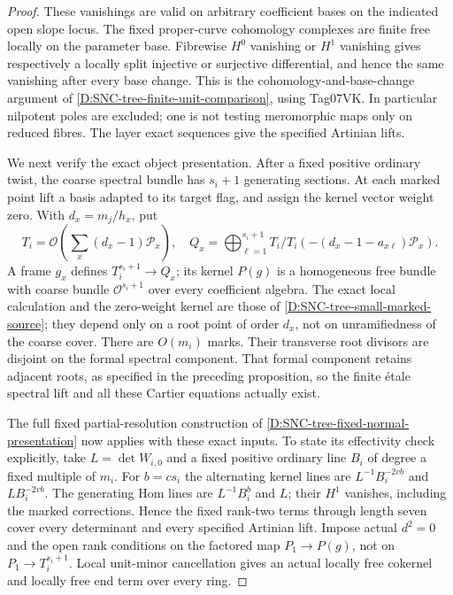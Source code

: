 \begin{proof}
These vanishings are valid on arbitrary coefficient
bases on the indicated open slope locus. The fixed
proper-curve cohomology complexes are finite free
locally on the parameter base. Fibrewise \(H^0\)
vanishing or \(H^1\) vanishing gives respectively
a locally split injective or surjective differential,
and hence the same vanishing after every base change.
This is the cohomology-and-base-change argument of
\ref{D:SNC-tree-finite-unit-comparison}, using
Tag07VK. In particular nilpotent poles are excluded;
one is not testing meromorphic maps only on reduced
fibres. The layer exact sequences give the specified
Artinian lifts.

We next verify the exact object presentation. After
a fixed positive ordinary twist, the coarse spectral
bundle has \(s_i+1\) generating sections. At each
marked point lift a basis adapted to its target
flag, and assign the kernel vector weight zero.
With \(d_x=m_j/h_x\), put
\[
 T_i=\mathcal O\!\left(\sum_x(d_x-1)\mathcal P_x\right),
 \quad
 Q_x=\bigoplus_{\ell=1}^{s_i+1}
     T_i/T_i(-(d_x-1-a_{x\ell})\mathcal P_x).
                                                        \tag{D.GP.7}
\]
A frame \(g_x\) defines \(T_i^{s_i+1}\to Q_x\);
its kernel \(P(g)\) is a homogeneous free bundle
with coarse bundle \(\mathcal O^{s_i+1}\) over
every coefficient algebra. The exact local
calculation and the zero-weight kernel are those
of \ref{D:SNC-tree-small-marked-source}; they depend
only on a root point of order \(d_x\), not on
unramifiedness of the coarse cover.
There are \(O(m_i)\) marks. Their transverse root
divisors are disjoint on the formal spectral
component. That formal component retains adjacent
roots, as specified in the preceding proposition,
so the finite étale spectral lift and all these
Cartier equations actually exist.

The full fixed partial-resolution construction of
\ref{D:SNC-tree-fixed-normal-presentation} now applies
with these exact inputs. To state its effectivity
check explicitly, take \(L=\det W_{i,0}\) and a
fixed positive ordinary line \(B_i\) of degree
a fixed multiple of \(m_i\). For \(b=cs_i\) the
alternating kernel lines are
\(L^{-1}B_i^{-2vb}\) and \(LB_i^{-2vb}\).
The generating Hom lines are \(L^{-1}B_i^b\) and
\(L\); their \(H^1\) vanishes, including the marked
corrections. Hence the fixed rank-two terms through
length seven cover every determinant and every
specified Artinian lift. Impose actual \(d^2=0\)
and the open rank conditions on the factored
map \(P_1\to P(g)\), not on \(P_1\to T_i^{s_i+1}\).
Local unit-minor cancellation gives an actual
locally free cokernel and locally free end term
over every ring.


\end{proof}

